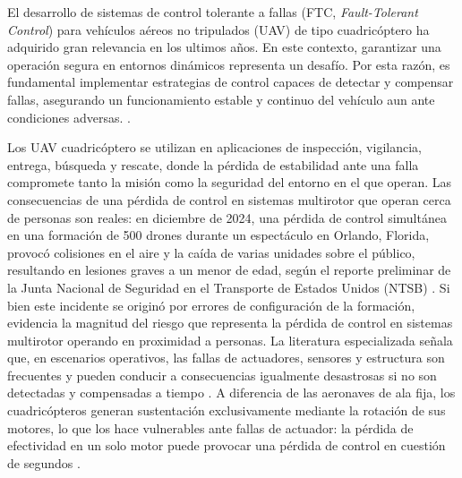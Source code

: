 

\noindent El desarrollo de sistemas de control tolerante a fallas (FTC,
\textit{Fault-Tolerant Control}) para vehículos aéreos no tripulados (UAV) de tipo cuadricóptero ha adquirido gran relevancia en los ultimos años. En este contexto, garantizar una operación segura en entornos dinámicos representa un desafío. Por esta razón, es fundamental implementar estrategias de control capaces de detectar y compensar fallas, asegurando un funcionamiento estable y continuo del vehículo aun ante condiciones adversas. \cite{freddi2019,ozcan2024}.


\noindent Los UAV cuadricóptero se utilizan en aplicaciones de inspección, vigilancia, entrega, búsqueda y rescate, donde la pérdida de estabilidad ante una falla compromete tanto la misión como la seguridad del entorno en el que operan. Las consecuencias de una pérdida de control en sistemas multirotor que operan cerca de personas son reales: en diciembre de 2024, una pérdida de control simultánea en una formación de 500 drones durante un espectáculo en Orlando, Florida, provocó colisiones en el aire y la caída de varias unidades sobre el público, resultando en lesiones graves a un menor de edad, según el reporte preliminar de la Junta Nacional de Seguridad en el Transporte de Estados 
Unidos (NTSB) \cite{ntsb2024}. Si bien este incidente se originó por errores de configuración de la formación, evidencia la magnitud del riesgo que representa la pérdida de control en sistemas multirotor operando en proximidad a personas. La literatura especializada señala que, en escenarios operativos, las fallas de actuadores, sensores y estructura son frecuentes y pueden conducir a consecuencias igualmente desastrosas si no son detectadas y compensadas a tiempo \cite{quadcopter2024, fdd2021survey}. A diferencia de las aeronaves de ala fija, los cuadricópteros generan sustentación exclusivamente mediante la rotación de sus motores, lo que los hace 
vulnerables ante fallas de actuador: la pérdida de efectividad en un solo motor puede provocar una pérdida de control en cuestión de segundos \cite{amoozgar2013}.

